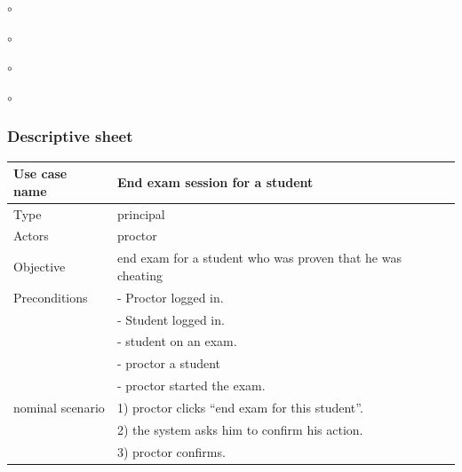 \documentclass[]{uc2pfecaneva}
\begin{document}
\begin{list}{$\circ$}{}
\begin{list}{$\circ$}{}
\begin{list}{$\circ$}{}
\begin{list}{$\circ$}{}
\begin{table}[h]
        \subsubsection{Descriptive sheet}
        \centering
        \begin{tabularx}{\textwidth}{|l|X|}
            \hline
            Use case name         & End exam session for a student                                                                                                \\ \hline
            Type                  & principal                                                                                                              \\ \hline
            Actors                & proctor                                                                                                                \\ \hline
            Objective             & end exam for a student who was proven that he was cheating                                                             \\ \hline
            Preconditions
            & - Proctor logged in.                                                                                                   \\
            & - Student logged in.                                                                                                   \\
            & - student on an exam.                                                                                                  \\
            & - proctor a student                                                                                                 \\
            & - proctor started the exam.                                                                                            \\ \hline
            nominal scenario
            & 1) proctor clicks “end exam for this student”.                                                                         \\
            & 2) the system asks him to confirm his action.                                                                          \\
            & 3) proctor confirms.                                                                                                \\

\end{tabularx}
\end{table}
\end{list}
\end{list}
\end{list}
\end{list}
\end{document}
